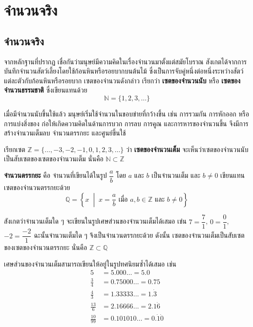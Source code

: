 \newpage

\chapter{จำนวนจริง}
\section{จำนวนจริง}
จากหลักฐานที่ปรากฏ เชื่อกันว่ามนุษย์มีความคิดในเรื่องจำนวนมาตั้งแต่สมัยโบราณ สังเกตได้จากการบันทึกจำนวนสัตว์เลี้ยงโดยใช้ก้อนหินหรือรอยบากบนต้นไม้ ซึ่งเป็นการจับคู่หนึ่งต่อหนึ่งระหว่างสัตว์แต่ละตัวกับก้อนหินหรือรอยบาก เซตของจำนวนดังกล่าว เรียกว่า \textbf{เซตของจำนวนนับ} หรือ \textbf{เซตของจำนวนธรรมชาติ} ซึ่งเขียนแทนด้วย
\begin{equation*}
	\mathbb{N} = \{1, 2, 3, \ldots\}
\end{equation*}

เมื่อมีจำนวนนับขึ้นใช้แล้ว มนุษย์เริ่มใช้จำนวนในขอบข่ายที่กว้างขึ้น เช่น การรวมกัน การหักออก หรือการแบ่งสิ่งของ ก่อให้เกิดความคิดในด้านการบวก การลบ การคูณ และการหารของจำนวนขึ้น จึงมีการสร้างจำนวนเต็มลบ จำนวนตรรกยะ และศูนย์ขึ้นใช้

เรียกเซต $\mathbb{Z} = \{\ldots, -3, -2, -1, 0, 1, 2, 3, \ldots\}$ ว่า \textbf{เซตของจำนวนเต็ม} จะเห็นว่าเซตของจำนวนนับเป็นสับเซตของเซตของจำนวนเต็ม นั่นคือ $\mathbb{N} \subset \mathbb{Z}$

\textbf{จำนวนตรรกยะ} คือ จำนวนที่เขียนได้ในรูป $\dfrac{a}{b}$ โดย $a$ และ $b$ เป็นจำนวนเต็ม และ $b \neq 0$ เขียนแทนเซตของจำนวนตรรกยะด้วย
\begin{equation*}
	\mathbb{Q} = \left\{ x \;\middle|\; x = \frac{a}{b} \text{ เมื่อ } a, b \in \mathbb{Z} \text{ และ } b \neq 0 \right\}
\end{equation*}

สังเกตว่าจำนวนเต็มใด ๆ จะเขียนในรูปเศษส่วนของจำนวนเต็มได้เสมอ เช่น $7 = \dfrac{7}{1}$, $0 = \dfrac{0}{1}$, $-2 = \dfrac{-2}{1}$ ฉะนั้นจำนวนเต็มใด ๆ จึงเป็นจำนวนตรรกยะด้วย ดังนั้น เซตของจำนวนเต็มเป็นสับเซตของเซตของจำนวนตรรกยะ นั่นคือ $\mathbb{Z} \subset \mathbb{Q}$

เศษส่วนของจำนวนเต็มสามารถเขียนให้อยู่ในรูปทศนิยมซ้ำได้เสมอ เช่น
\begin{align*}
	5 &= 5.000\ldots = 5.0 \\
	\frac{3}{4} &= 0.75000\ldots = 0.75 \\
	\frac{4}{3} &= 1.33333\ldots = 1.\dot{3} \\
	\frac{13}{6} &= 2.16666\ldots = 2.1\dot{6} \\
	\frac{10}{99} &= 0.101010\ldots = 0.\dot{1}\dot{0}
\end{align*}

